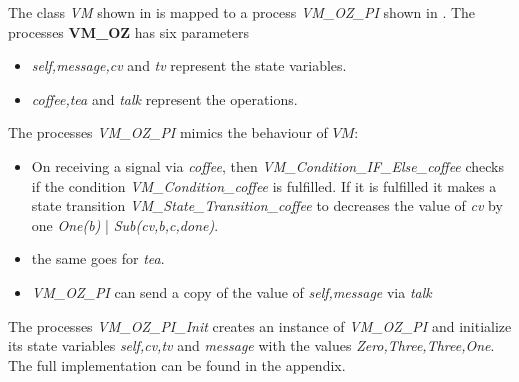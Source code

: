 The class \textit{VM} shown in  is mapped to a \picalc{} process \textit{VM\_OZ\_PI} shown in . The processes \textbf{VM\_OZ} has six parameters
\begin{itemize}
\item \textit{self,message,cv} and \textit{tv} represent the state variables.
\item \textit{coffee,tea} and \textit{talk} represent the operations.
\end{itemize}
The processes \textit{VM\_OZ\_PI} mimics the behaviour of $VM$:
\begin{itemize}
\item On receiving a signal via \textit{coffee}, then \textit{VM\_Condition\_IF\_Else\_coffee} checks if the condition \textit{VM\_Condition\_coffee} is fulfilled. If it is fulfilled it makes a state transition \textit{VM\_State\_Transition\_coffee} to decreases the value of \textit{cv} by one \textit{One(b) }| \textit{Sub(cv,b,c,done)}.
\item the same goes for \textit{tea}.
\item  \textit{VM\_OZ\_PI} can send a copy of the value of  \textit{self,message} via  \textit{talk}
\end{itemize}
The processes \textit{VM\_OZ\_PI\_Init} creates an instance of \textit{VM\_OZ\_PI} and initialize its state variables \textit{self,cv,tv} and \textit{message} with the values \textit{Zero,Three,Three,One}. The full implementation can be found in the appendix.

